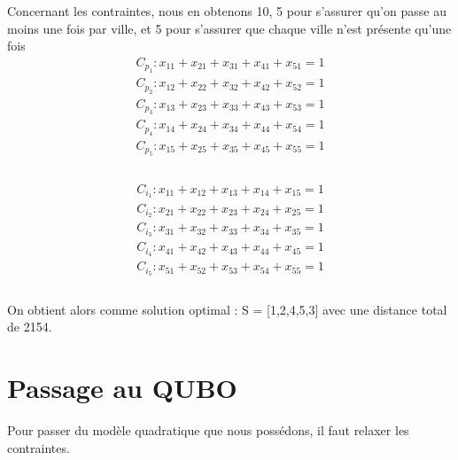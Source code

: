 \documentclass{article}
\begin{document}
        Concernant les contraintes, nous en obtenons 10, 5 pour s'assurer qu'on passe au moins une fois par ville, et 5 pour s'assurer que chaque ville n'est présente qu'une fois
        \begin{equation*}
            \begin{aligned}
                C_{p_{1}} : x_{11}+x_{21}+x_{31}+x_{41}+x_{51} = 1\\
                C_{p_{2}} : x_{12}+x_{22}+x_{32}+x_{42}+x_{52} = 1\\
                C_{p_{3}} : x_{13}+x_{23}+x_{33}+x_{43}+x_{53} = 1\\
                C_{p_{4}} : x_{14}+x_{24}+x_{34}+x_{44}+x_{54} = 1\\
                C_{p_{5}} : x_{15}+x_{25}+x_{35}+x_{45}+x_{55} = 1\\
            \end{aligned}
        \end{equation*}
        \\
        \begin{equation*}
            \begin{aligned}
                C_{i_{1}} : x_{11}+x_{12}+x_{13}+x_{14}+x_{15} = 1\\
                C_{i_{2}} : x_{21}+x_{22}+x_{23}+x_{24}+x_{25} = 1\\
                C_{i_{3}} : x_{31}+x_{32}+x_{33}+x_{34}+x_{35} = 1\\
                C_{i_{4}} : x_{41}+x_{42}+x_{43}+x_{44}+x_{45} = 1\\
                C_{i_{5}} : x_{51}+x_{52}+x_{53}+x_{54}+x_{55} = 1\\
            \end{aligned}
        \end{equation*}
        \\
        On obtient alors comme solution optimal :
        S = [1,2,4,5,3] avec une distance total de 2154.



        \section{Passage au QUBO}\label{sec:passage-au-qubo}

        Pour passer du modèle quadratique que nous possédons, il faut relaxer les contraintes.\\\\
\end{document}
